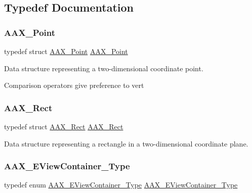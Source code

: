 \subsection{Typedef Documentation}
\mbox{\label{a00503_aace06b5ca898ac66c68fe5f5c598f0b6}} 
\subsubsection{\texorpdfstring{AAX\_Point}{AAX\_Point}}
{\footnotesize\ttfamily typedef struct \mbox{\hyperlink{a01609}{A\+A\+X\+\_\+\+Point}}  \mbox{\hyperlink{a01609}{A\+A\+X\+\_\+\+Point}}}



Data structure representing a two-\/dimensional coordinate point. 

Comparison operators give preference to {\ttfamily vert} \mbox{\label{a00503_a85ca9d563f37484d29b66a2e4ec6598f}} 
\subsubsection{\texorpdfstring{AAX\_Rect}{AAX\_Rect}}
{\footnotesize\ttfamily typedef struct \mbox{\hyperlink{a01613}{A\+A\+X\+\_\+\+Rect}}  \mbox{\hyperlink{a01613}{A\+A\+X\+\_\+\+Rect}}}



Data structure representing a rectangle in a two-\/dimensional coordinate plane. 

\mbox{\label{a00503_ab4c36de253fc80b541eb51074c64caef}} 
\subsubsection{\texorpdfstring{AAX\_EViewContainer\_Type}{AAX\_EViewContainer\_Type}}
{\footnotesize\ttfamily typedef enum \mbox{\hyperlink{a00503_a89d5cb8c7fdb11f34e695fb0e057b764}{A\+A\+X\+\_\+\+E\+View\+Container\+\_\+\+Type}}  \mbox{\hyperlink{a00503_a89d5cb8c7fdb11f34e695fb0e057b764}{A\+A\+X\+\_\+\+E\+View\+Container\+\_\+\+Type}}}



